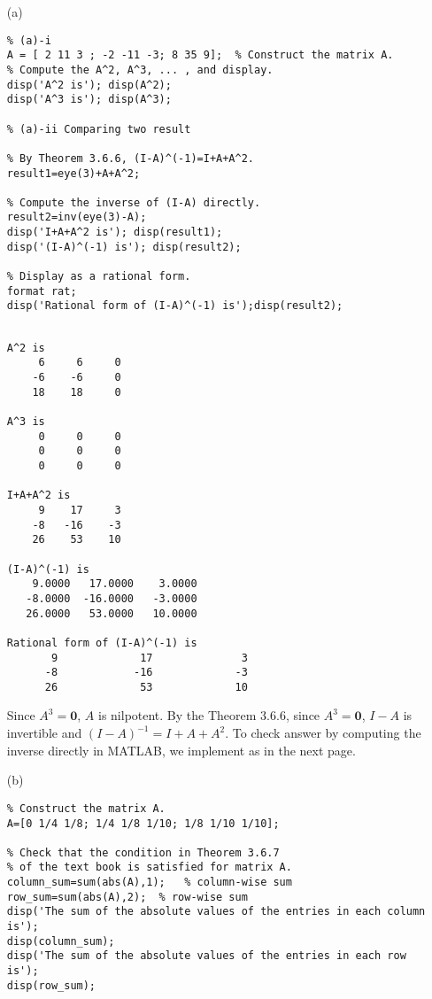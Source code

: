 \begin{sol}
\verb""
\begin{enumerate}
\item[(a)]
\begin{verbatim}
% (a)-i
A = [ 2 11 3 ; -2 -11 -3; 8 35 9];  % Construct the matrix A.
% Compute the A^2, A^3, ... , and display.
disp('A^2 is'); disp(A^2);
disp('A^3 is'); disp(A^3);

% (a)-ii Comparing two result

% By Theorem 3.6.6, (I-A)^(-1)=I+A+A^2.
result1=eye(3)+A+A^2;  

% Compute the inverse of (I-A) directly.
result2=inv(eye(3)-A);
disp('I+A+A^2 is'); disp(result1);
disp('(I-A)^(-1) is'); disp(result2);

% Display as a rational form.
format rat;	
disp('Rational form of (I-A)^(-1) is');disp(result2);
\end{verbatim}

\begin{outputs}

\begin{verbatim}

A^2 is
     6     6     0
    -6    -6     0
    18    18     0

A^3 is
     0     0     0
     0     0     0
     0     0     0

I+A+A^2 is
     9    17     3
    -8   -16    -3
    26    53    10

(I-A)^(-1) is
    9.0000   17.0000    3.0000
   -8.0000  -16.0000   -3.0000
   26.0000   53.0000   10.0000

Rational form of (I-A)^(-1) is
       9             17              3       
      -8            -16             -3       
      26             53             10       
\end{verbatim}

\end{outputs}

\noindent Since $A^{3} = \mathbf{0}$, $A$ is nilpotent. 
By the Theorem $3.6.6$, since $A^{3} = \mathbf{0}$, $I-A$ is invertible and $(I-A)^{-1} = I + A + A^{2}.$ To check answer by computing the inverse directly in MATLAB, we implement as in the next page.


\item[(b)]
\begin{verbatim}
% Construct the matrix A.
A=[0 1/4 1/8; 1/4 1/8 1/10; 1/8 1/10 1/10]; 

% Check that the condition in Theorem 3.6.7 
% of the text book is satisfied for matrix A.
column_sum=sum(abs(A),1);   % column-wise sum 
row_sum=sum(abs(A),2);  % row-wise sum
disp('The sum of the absolute values of the entries in each column is');
disp(column_sum);
disp('The sum of the absolute values of the entries in each row is');
disp(row_sum);


\end{verbatim}
\end{enumerate}
\end{sol}
